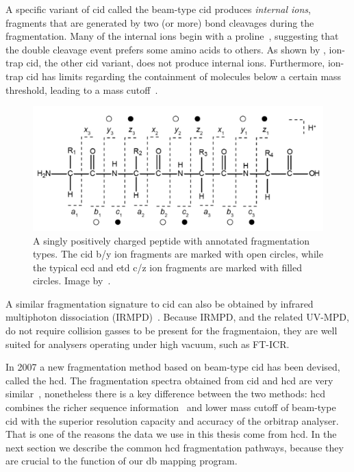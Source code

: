 A specific variant of \gls*{cid} called the beam-type \gls*{cid} produces \emph{internal ions}, fragments that are generated by two (or more) bond cleavages during the fragmentation. Many of the internal ions begin with a proline~\cite{michalski2012systematic}, suggesting that the double cleavage event prefers some amino acids to others. As shown by \citet{michalski2012systematic}, ion-trap \gls*{cid}, the other \gls*{cid} variant, does not produce internal ions. Furthermore, ion-trap \gls*{cid} has limits regarding the containment of molecules below a certain mass threshold, leading to a mass cutoff~\cite{louris1987instrumentation}.

\begin{figure}
  \centering
  \includegraphics[width=.75\linewidth]{img/fragment-types.png}
  \caption{A singly positively charged peptide with annotated fragmentation types. The \gls*{cid} b/y ion fragments are marked with open circles, while the typical \gls*{ecd} and \gls*{etd} c/z ion fragments are marked with filled circles. Image by~\citet{hart2014review}.}\label{fig:fragment-types}
\end{figure}

A similar fragmentation signature to \gls*{cid} can also be obtained by infrared multiphoton dissociation (IRMPD)~\cite{oomens2006gas}. Because IRMPD, and the related UV-MPD, do not require collision gasses to be present for the fragmentaion, they are well suited for analysers operating under high vacuum, such as FT-ICR\@.

In 2007 a new fragmentation method based on beam-type \gls*{cid} has been devised, called the \gls*{hcd}\@. The fragmentation spectra obtained from \gls*{cid} and \gls*{hcd} are very similar~\cite{michalski2012systematic}, nonetheless there is a key difference between the two methods: \gls*{hcd} combines the richer sequence information~\cite{xia2006ion} and lower mass cutoff of beam-type \gls*{cid} with the superior resolution capacity and accuracy of the orbitrap analyser. That is one of the reasons the data we use in this thesis come from \gls*{hcd}\@. In the next section we describe the common \gls*{hcd} fragmentation pathways, because they are crucial to the function of our \gls*{db} mapping program.

